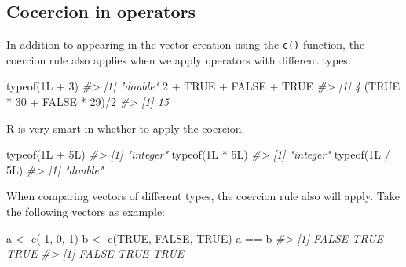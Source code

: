 \documentclass[
]{book}
\newenvironment{Shaded}{\begin{snugshade}}{\end{snugshade}}
\newcommand{\CommentTok}[1]{\textcolor[rgb]{0.56,0.35,0.01}{\textit{#1}}}
\newcommand{\ConstantTok}[1]{\textcolor[rgb]{0.00,0.00,0.00}{#1}}
\newcommand{\DecValTok}[1]{\textcolor[rgb]{0.00,0.00,0.81}{#1}}
\newcommand{\FunctionTok}[1]{\textcolor[rgb]{0.00,0.00,0.00}{#1}}
\newcommand{\NormalTok}[1]{#1}
\newcommand{\OtherTok}[1]{\textcolor[rgb]{0.56,0.35,0.01}{#1}}
\newcommand{\SpecialCharTok}[1]{\textcolor[rgb]{0.00,0.00,0.00}{#1}}
\newenvironment{blackbox}{
  \definecolor{shadecolor}{rgb}{0, 0, 0}  %
  \color{white}
  \begin{shaded}}
 {\end{shaded}}
\newenvironment{infobox}[1]
  {
  \begin{itemize}
  \renewcommand{\labelitemi}{
    \raisebox{-.7\height}[0pt][0pt]{
      {\setkeys{Gin}{width=3em,keepaspectratio}
        \texttt{[image: pics/\#1]}}
    }
  }
  \setlength{\fboxsep}{1em}
  \begin{blackbox}
  \item
  }
  {
  \end{blackbox}
  \end{itemize}
  }
\begin{document}
\hypertarget{cocercion-in-operators}{%
\subsection{Cocercion in operators}\label{cocercion-in-operators}}

In addition to appearing in the vector creation using the \texttt{c()} function, the coercion rule also applies when we apply operators with different types.

\begin{Shaded}
\begin{Highlighting}[]
\FunctionTok{typeof}\NormalTok{(1L }\SpecialCharTok{+} \DecValTok{3}\NormalTok{)}
\CommentTok{\#\textgreater{} [1] "double"}
\DecValTok{2} \SpecialCharTok{+} \ConstantTok{TRUE} \SpecialCharTok{+} \ConstantTok{FALSE} \SpecialCharTok{+} \ConstantTok{TRUE}
\CommentTok{\#\textgreater{} [1] 4}
\NormalTok{(}\ConstantTok{TRUE} \SpecialCharTok{*} \DecValTok{30} \SpecialCharTok{+} \ConstantTok{FALSE} \SpecialCharTok{*} \DecValTok{29}\NormalTok{)}\SpecialCharTok{/}\DecValTok{2}
\CommentTok{\#\textgreater{} [1] 15}
\end{Highlighting}
\end{Shaded}

\begin{infobox}{caution}

R is very smart in whether to apply the coercion.

\begin{Shaded}
\begin{Highlighting}[]
\FunctionTok{typeof}\NormalTok{(1L }\SpecialCharTok{+}\NormalTok{ 5L)}
\CommentTok{\#\textgreater{} [1] "integer"}
\FunctionTok{typeof}\NormalTok{(1L }\SpecialCharTok{*}\NormalTok{ 5L)}
\CommentTok{\#\textgreater{} [1] "integer"}
\FunctionTok{typeof}\NormalTok{(1L }\SpecialCharTok{/}\NormalTok{ 5L)}
\CommentTok{\#\textgreater{} [1] "double"}
\end{Highlighting}
\end{Shaded}

\end{infobox}

When comparing vectors of different types, the coercion rule also will apply. Take the following vectors as example:

\begin{Shaded}
\begin{Highlighting}[]
\NormalTok{a }\OtherTok{\textless{}{-}} \FunctionTok{c}\NormalTok{(}\SpecialCharTok{{-}}\DecValTok{1}\NormalTok{, }\DecValTok{0}\NormalTok{, }\DecValTok{1}\NormalTok{)}
\NormalTok{b }\OtherTok{\textless{}{-}} \FunctionTok{c}\NormalTok{(}\ConstantTok{TRUE}\NormalTok{, }\ConstantTok{FALSE}\NormalTok{, }\ConstantTok{TRUE}\NormalTok{)}
\NormalTok{a }\SpecialCharTok{==}\NormalTok{ b}
\CommentTok{\#\textgreater{} [1] FALSE  TRUE  TRUE}
\CommentTok{\#\textgreater{} [1] FALSE  TRUE  TRUE}
\end{Highlighting}
\end{Shaded}
\end{document}
